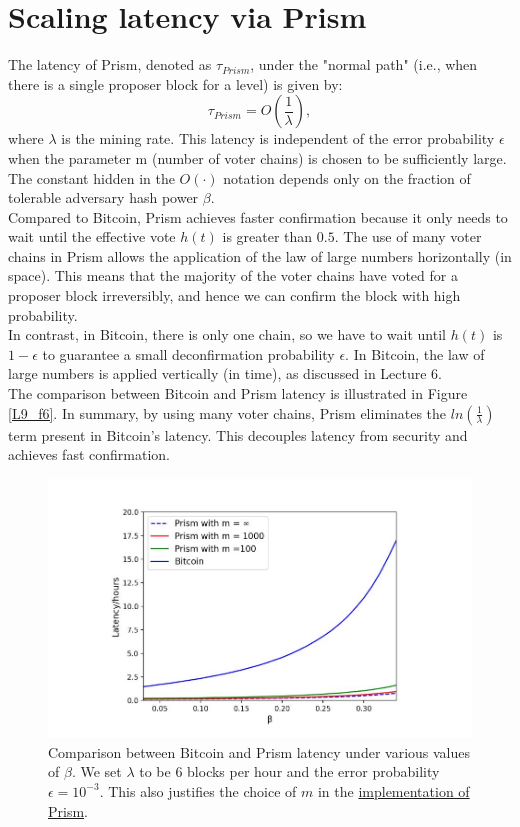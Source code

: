 \section{Scaling latency via Prism}
The latency of Prism, denoted as $\tau_{Prism}$, under the "normal path" (i.e., when there is a single proposer block for a level) is given by:\\
\begin{equation*}
	\tau_{Prism} = O(\frac{1}{\lambda}),
\end{equation*}
where $\lambda$ is the mining rate. This latency is independent of the error probability $\epsilon$ when the parameter m (number of voter chains) is chosen to be sufficiently large. The constant hidden in the $O(·)$ notation depends only on the fraction of tolerable adversary hash power $\beta$.\\
Compared to Bitcoin, Prism achieves faster confirmation because it only needs to wait until the effective vote $h(t)$ is greater than $0.5$. The use of many voter chains in Prism allows the application of the law of large numbers horizontally (in space). This means that the majority of the voter chains have voted for a proposer block irreversibly, and hence we can confirm the block with high probability.\\
In contrast, in Bitcoin, there is only one chain, so we have to wait until $h(t)$ is $1 - \epsilon$ to guarantee a small deconfirmation probability $\epsilon$. In Bitcoin, the law of large numbers is applied vertically (in time), as discussed in Lecture 6.\\
The comparison between Bitcoin and Prism latency is illustrated in Figure \ref{L9_f6}. In summary, by using many voter chains, Prism eliminates the $ln(\frac{1}{\lambda})$ term present in Bitcoin's latency. This decouples latency from security and achieves fast confirmation.
\begin{center}
	\begin{figure}
		\centering
		\includegraphics[width=0.8\linewidth]{Fig/09/F6}
		\caption{Comparison between Bitcoin and Prism latency under various values of $\beta$. We set $\lambda$ to be 6 blocks per hour and the error probability $\epsilon = 10^{−3}$. This also justifies the choice of $m$ in the \href{https://arxiv.org/abs/1909.11261}{implementation of Prism}.}
		\label{fig:L9_f6}
	\end{figure}
\end{center}